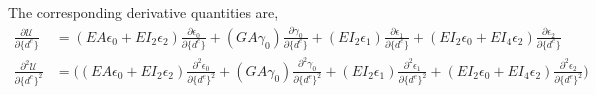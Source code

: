 \documentclass[10pt]{article}
\begin{document}
The corresponding derivative quantities are,
\begin{align}
  \frac{\partial \mathcal{U}}{\partial \{d^e\}} &= (EA\epsilon_0 +
                                                  EI_2\epsilon_2)            
                                                  \frac{\partial
                                                  \epsilon_0}{\partial
                                                  \{d^e\}} +
                                                  (GA\gamma_0)
                                                  \frac{\partial
                                                  \gamma_0}{\partial
                                                  \{d^e\}} +
                                                  (EI_2\epsilon_1)
                                                  \frac{\partial
                                                  \epsilon_1}{\partial
                                                  \{d^e\}}
                                                + (EI_2\epsilon_0
                                                  +EI_4\epsilon_2)
                                                  \frac{\partial
                                                  \epsilon_2}
                                                  {\partial
                                                  \{d^e\}}\nonumber\\
  \frac{\partial^2 \mathcal{U}}{\partial {\{d^e\}}^2} &= \Biggl((EA\epsilon_0 +
                                                  EI_2\epsilon_2) 
                                                  \frac{\partial^2
                                                  \epsilon_0}{\partial
                                                  \{d^e\}^2} +
                                                  (GA\gamma_0)
                                                  \frac{\partial^2
                                                  \gamma_0}{\partial
                                                  \{d^e\}^2} +
                                                  (EI_2\epsilon_1)
                                                  \frac{\partial^2
                                                  \epsilon_1}{\partial
                                                  \{d^e\}^2}
                                                + (EI_2\epsilon_0
                                                  +EI_4\epsilon_2)
                                                  \frac{\partial^2
                                                  \epsilon_2}
                                                  {\partial
                                                        \{d^e\}^2}\Biggr)\nonumber\\

\end{align}
\end{document}
